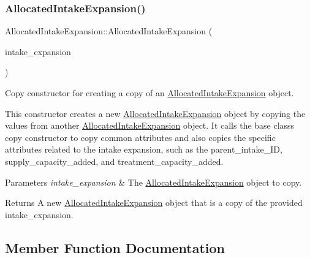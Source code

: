 \subsubsection{\texorpdfstring{Allocated\+Intake\+Expansion()}{AllocatedIntakeExpansion()}\hspace{0.1cm}{\footnotesize\ttfamily [2/2]}}
{\footnotesize\ttfamily Allocated\+Intake\+Expansion\+::\+Allocated\+Intake\+Expansion (\begin{DoxyParamCaption}\item[{const \mbox{\hyperlink{classAllocatedIntakeExpansion}{Allocated\+Intake\+Expansion}} \&}]{intake\+\_\+expansion }\end{DoxyParamCaption})}



Copy constructor for creating a copy of an {\ttfamily \mbox{\hyperlink{classAllocatedIntakeExpansion}{Allocated\+Intake\+Expansion}}} object. 

This constructor creates a new {\ttfamily \mbox{\hyperlink{classAllocatedIntakeExpansion}{Allocated\+Intake\+Expansion}}} object by copying the values from another {\ttfamily \mbox{\hyperlink{classAllocatedIntakeExpansion}{Allocated\+Intake\+Expansion}}} object. It calls the base class\textquotesingle{}s copy constructor to copy common attributes and also copies the specific attributes related to the intake expansion, such as the {\ttfamily parent\+\_\+intake\+\_\+\+ID}, {\ttfamily supply\+\_\+capacity\+\_\+added}, and {\ttfamily treatment\+\_\+capacity\+\_\+added}.


\begin{DoxyParams}{Parameters}
{\em intake\+\_\+expansion} & The {\ttfamily \mbox{\hyperlink{classAllocatedIntakeExpansion}{Allocated\+Intake\+Expansion}}} object to copy.\\
\hline
\end{DoxyParams}
\begin{DoxyReturn}{Returns}
A new {\ttfamily \mbox{\hyperlink{classAllocatedIntakeExpansion}{Allocated\+Intake\+Expansion}}} object that is a copy of the provided {\ttfamily intake\+\_\+expansion}. 
\end{DoxyReturn}


\subsection{Member Function Documentation}
\mbox{\label{classAllocatedIntakeExpansion_a67185ec779549c32b289666663232bc4}} 
